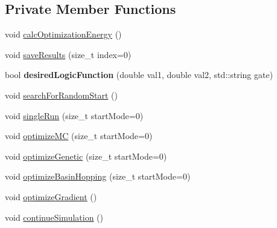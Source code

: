 \subsection*{Private Member Functions}
\begin{DoxyCompactItemize}
\item 
void \hyperlink{classOptimizer_a82f53be5481740bf2cc2ff921af38a51}{calc\+Optimization\+Energy} ()
\item 
void \hyperlink{classOptimizer_a67407e1db0c02fa16ac4c6438dcd0e74}{save\+Results} (size\+\_\+t index=0)
\item 
\mbox{\label{classOptimizer_a92ae8533ed25af8f0071124913418ea9}} 
bool {\bfseries desired\+Logic\+Function} (double val1, double val2, std\+::string gate)
\item 
void \hyperlink{classOptimizer_a5dfd9a3a649ffa7e064c49d00afdb384}{search\+For\+Random\+Start} ()
\item 
void \hyperlink{classOptimizer_aff5efd6e481349d870e12221ce865a25}{single\+Run} (size\+\_\+t start\+Mode=0)
\item 
void \hyperlink{classOptimizer_a70cfb2468659d3d06d2fb7ba959c1f67}{optimize\+MC} (size\+\_\+t start\+Mode=0)
\item 
void \hyperlink{classOptimizer_a927fdf3177a1e0479d2caf69af541c5d}{optimize\+Genetic} (size\+\_\+t start\+Mode=0)
\item 
void \hyperlink{classOptimizer_a53f16ba66dc160c7f7c8e27e8e3de90f}{optimize\+Basin\+Hopping} (size\+\_\+t start\+Mode=0)
\item 
void \hyperlink{classOptimizer_a29a003cd019aa5908d1bb2bd317b1589}{optimize\+Gradient} ()
\item 
void \hyperlink{classOptimizer_accdf2a36a2b565ec87f5a251c970520e}{continue\+Simulation} ()
\end{DoxyCompactItemize}
